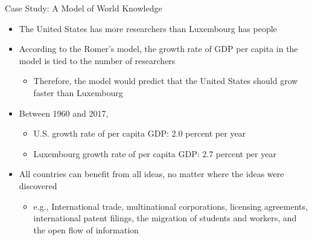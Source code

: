 \documentclass[aspectratio=1610]{beamer}
\begin{document}
%			

\begin{frame}[wide]{Case Study: A Model of World Knowledge}
	\begin{itemize}
		\item The United States has more researchers than Luxembourg has people
		\item According to the Romer's model, the growth rate of GDP per capita in the model is tied to the number of researchers
		\begin{itemize}
			\item Therefore, the model would predict that the United States should grow faster than Luxembourg
		\end{itemize}
		\item Between 1960 and 2017,
		\begin{itemize}
			\item U.S. growth rate of per capita GDP: 2.0 percent per year
			\item Luxembourg growth rate of per capita GDP: 2.7 percent per year
		\end{itemize}
		\item All countries can benefit from all ideas, no matter where the ideas were discovered
		\begin{itemize}
			\item e.g., International trade, multinational corporations, licensing agreements, international patent filings, the migration of students and workers, and the open flow of information 
		\end{itemize}
	\end{itemize}
\end{frame}
\end{document}
